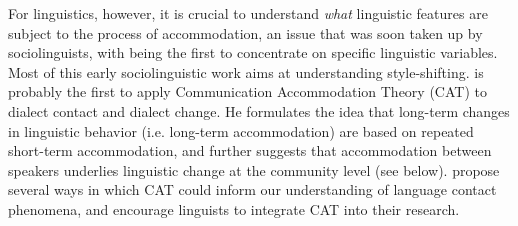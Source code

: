 \documentclass[output=paper,
modfonts
]{langscibook}
\begin{document}
For linguistics, however, it is crucial to understand \textit{what} linguistic features are subject to the process of accommodation, an issue that was soon taken up by sociolinguists, with \cite{coupland_accommodation_1984} being the first to concentrate on specific linguistic variables. Most of this early sociolinguistic work \citep[e.g.][]{rickford_adressee-_1994,coupland_accommodation_1984,bell_language_1984,selting_levels_1985} aims at understanding style-shifting. \cite{trudgill_dialects_1986} is probably the first to apply Communication Accommodation Theory (CAT) to dialect contact and dialect change. He formulates the idea that long-term changes in linguistic behavior (i.e. long-term accommodation) are based on repeated short-term accommodation, and further suggests that accommodation between speakers underlies linguistic change at the community level (see below). \cite{niedzielski_linguistic_1996} propose several ways in which CAT could inform our understanding of language contact phenomena, and encourage linguists to integrate CAT into their research.
% 
% 
% 
% 
% 
% 
% 
% 
\end{document}

